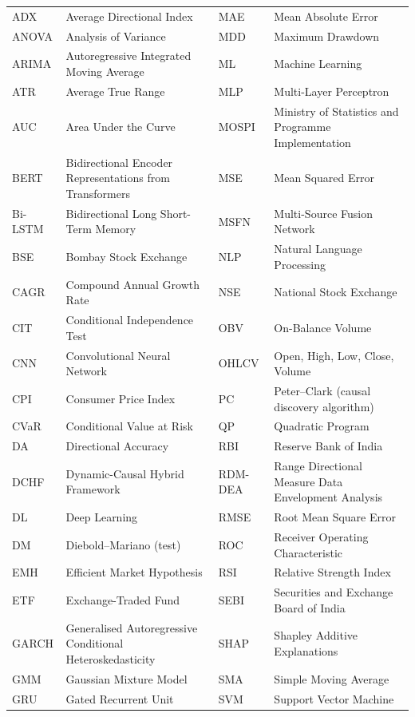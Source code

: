 \begin{center}
\small
{}
\begin{tabular}{@{}p{2.1cm}p{4.6cm}p{2.1cm}p{4.6cm}@{}}
ADX & Average Directional Index & MAE & Mean Absolute Error \\
ANOVA & Analysis of Variance & MDD & Maximum Drawdown \\
ARIMA & Autoregressive Integrated Moving Average & ML & Machine Learning \\
ATR & Average True Range & MLP & Multi-Layer Perceptron \\
AUC & Area Under the Curve & MOSPI & Ministry of Statistics and Programme Implementation \\
BERT & Bidirectional Encoder Representations from Transformers & MSE & Mean Squared Error \\
Bi-LSTM & Bidirectional Long Short-Term Memory & MSFN & Multi-Source Fusion Network \\
BSE & Bombay Stock Exchange & NLP & Natural Language Processing \\
CAGR & Compound Annual Growth Rate & NSE & National Stock Exchange \\
CIT & Conditional Independence Test & OBV & On-Balance Volume \\
CNN & Convolutional Neural Network & OHLCV & Open, High, Low, Close, Volume \\
CPI & Consumer Price Index & PC & Peter--Clark (causal discovery algorithm) \\
CVaR & Conditional Value at Risk & QP & Quadratic Program \\
DA & Directional Accuracy & RBI & Reserve Bank of India \\
DCHF & Dynamic-Causal Hybrid Framework & RDM-DEA & Range Directional Measure Data Envelopment Analysis \\
DL & Deep Learning & RMSE & Root Mean Square Error \\
DM & Diebold--Mariano (test) & ROC & Receiver Operating Characteristic \\
EMH & Efficient Market Hypothesis & RSI & Relative Strength Index \\
ETF & Exchange-Traded Fund & SEBI & Securities and Exchange Board of India \\
GARCH & Generalised Autoregressive Conditional Heteroskedasticity & SHAP & Shapley Additive Explanations \\
GMM & Gaussian Mixture Model & SMA & Simple Moving Average \\
GRU & Gated Recurrent Unit & SVM & Support Vector Machine \\

\end{tabular}
\end{center}
